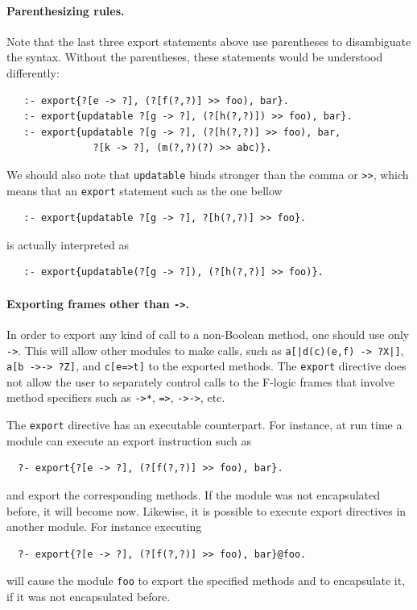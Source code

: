 \documentclass[11pt]{article}
\begin{document}
\paragraph{Parenthesizing rules.}
Note that the last three export statements above use parentheses to
disambiguate the syntax. Without the parentheses, these statements would be
understood differently:
\begin{verbatim}
   :- export{?[e -> ?], (?[f(?,?)] >> foo), bar}.
   :- export{updatable ?[g -> ?], (?[h(?,?)]) >> foo), bar}.
   :- export{updatable ?[g -> ?], (?[h(?,?)] >> foo), bar,
               ?[k -> ?], (m(?,?)(?) >> abc)}.  
\end{verbatim}
We should also note that {\tt updatable} binds stronger than the comma or
{\tt >{}>}, which means that an {\tt export} statement such as the one bellow
\begin{verbatim}
   :- export{updatable ?[g -> ?], ?[h(?,?)] >> foo}.
\end{verbatim}
is actually interpreted as
\begin{verbatim}
   :- export{updatable(?[g -> ?]), (?[h(?,?)] >> foo)}.
\end{verbatim}

\paragraph{Exporting frames other than {\tt ->}.}  
In order to export any kind of call to a non-Boolean
method, one should use only {\tt ->}. This will
allow other modules to make calls, such as {\tt a[|d(c)(e,f) -> ?X|]}, {\tt
  a[b ->-> ?Z]}, and {\tt c[e=>t]}  to the exported methods.  The {\tt export}
directive does not allow the user to separately control calls to the
F-logic frames that involve method specifiers such as {\tt ->*}, {\tt =>},
{\tt ->->}, etc.

The {\tt export} directive has an executable counterpart. For instance, at
run time a module can execute an export instruction such as 
\begin{verbatim}
  ?- export{?[e -> ?], (?[f(?,?)] >> foo), bar}.
\end{verbatim}
and export the corresponding methods. If the module was not encapsulated
before, it will become now. Likewise, it is possible to execute export
directives in another module. For instance executing
\begin{verbatim}
  ?- export{?[e -> ?], (?[f(?,?)] >> foo), bar}@foo.
\end{verbatim}
will cause the module {\tt foo} to export the specified methods and to
encapsulate it, if it was not encapsulated before. 
\end{document}
